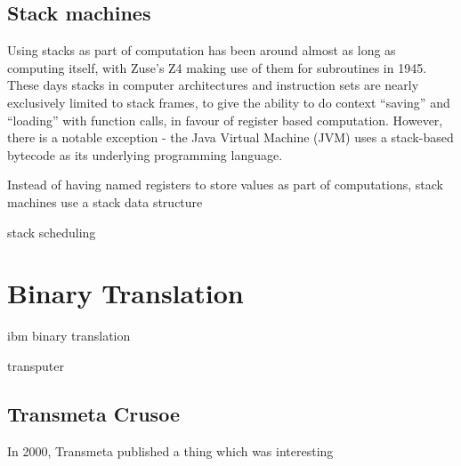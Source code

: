\subsection{Stack machines}
Using stacks as part of computation has been around almost as long as computing
itself, with Zuse's Z4 making use of them for subroutines in
1945.\cite{Speiser2000KZZ} These days stacks in computer architectures and
instruction sets are nearly exclusively limited to stack frames, to give the
ability to do context ``saving'' and ``loading'' with function calls, in favour
of register based computation. However, there is a notable exception - the Java
Virtual Machine (JVM) uses a stack-based bytecode as its underlying programming
language.\cite{Schoeberl2005Design}

Instead of having named registers to store values as part of computations, stack
machines use a stack data structure


stack scheduling


\section{Binary Translation}
ibm binary translation

transputer

\subsection{Transmeta Crusoe}
In 2000, Transmeta published a thing which was interesting\cite{TransmetaCodeMorph}


